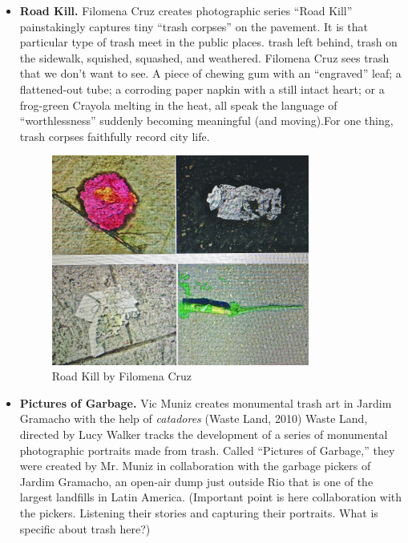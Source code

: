 \begin{itemize}
\item \textbf{Road Kill.} Filomena Cruz creates photographic series “Road Kill” painstakingly captures tiny “trash corpses” on the pavement. It is that particular type of trash meet in the public places. trash left behind, trash on the sidewalk, squished, squashed, and weathered. Filomena Cruz sees trash that we don’t want to see. A piece of chewing gum with an “engraved” leaf; a flattened-out tube; a corroding paper napkin with a still intact heart; or a frog-green Crayola melting in the heat, all speak the language of “worthlessness” suddenly becoming meaningful (and moving).For one thing, trash corpses faithfully record city life. 


  \begin{figure}[ht]
      \centering
      \includegraphics[width=0.8\textwidth]{graphics/FilomenaCruz_RoadKill_ReVista.jpg}
      \caption{Road Kill by Filomena Cruz}
      \label{fig:FilomenaCruz_RoadKill_ReVista}
  \end{figure}

\item \textbf{Pictures of Garbage.} Vic Muniz creates monumental trash art in Jardim Gramacho with the help of \textit{catadores} (Waste Land, 2010) Waste Land, directed by Lucy Walker  tracks the development of a series of monumental photographic portraits made from trash. Called “Pictures of Garbage,” they were created by Mr. Muniz in collaboration with the garbage pickers of Jardim Gramacho, an open-air dump just outside Rio that is one of the largest landfills in Latin America. (Important point is here collaboration with the pickers. Listening their stories and capturing their portraits. What is specific about trash here?)


\end{itemize}

